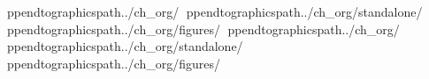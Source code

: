 ppendtographicspath{{../ch_org/}}
ppendtographicspath{{../ch_org/standalone/}}
ppendtographicspath{{../ch_org/figures/}}
ppendtographicspath{{../ch_org/}}
ppendtographicspath{{../ch_org/standalone/}}
ppendtographicspath{{../ch_org/figures/}}
